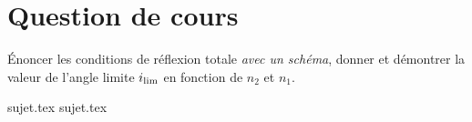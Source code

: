 \documentclass[a4paper, 11pt, oneside]{book}
\begin{document}
\section{Question de cours}

Énoncer les conditions de réflexion totale \textit{avec un schéma}, donner et
démontrer la valeur de l'angle limite $i_{\rm lim}$ en fonction de $n_2$ et
$n_1$.

{sujet.tex}
\resetQ
{sujet.tex}
\end{document}
